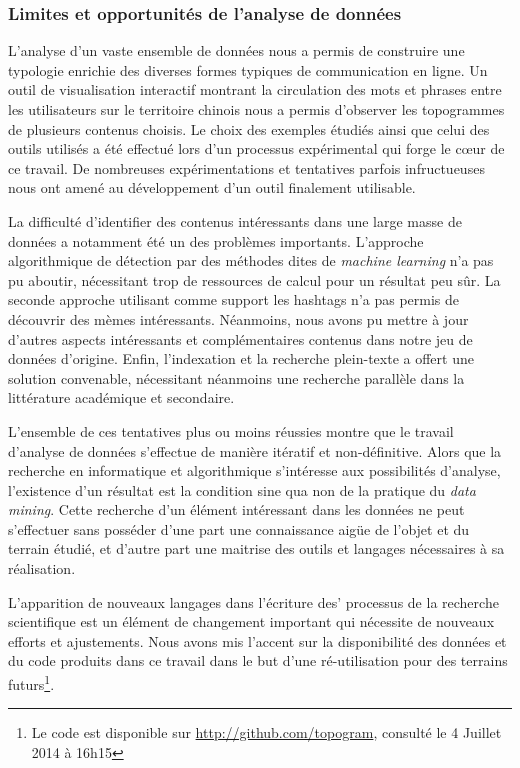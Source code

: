\subsubsection{Limites et opportunités de l'analyse de données}

L'analyse d'un vaste ensemble de données nous a permis de construire une typologie enrichie des diverses formes typiques de communication en ligne. Un outil de visualisation interactif montrant la circulation des mots et phrases entre les utilisateurs sur le territoire chinois nous a permis d'observer les topogrammes de plusieurs contenus choisis. Le choix des exemples étudiés ainsi que celui des outils utilisés a été effectué lors d'un processus expérimental qui forge le cœur de ce travail. De nombreuses expérimentations et tentatives parfois infructueuses nous ont amené au développement d'un outil finalement utilisable.

La difficulté d'identifier des contenus intéressants dans une large masse de données a notamment été un des problèmes importants. L'approche algorithmique de détection par des méthodes dites de \textit{machine learning} n'a pas pu aboutir, nécessitant trop de ressources de calcul pour un résultat peu sûr. La seconde approche utilisant comme support les hashtags n'a pas permis de découvrir des mèmes intéressants. Néanmoins, nous avons pu mettre à jour d'autres aspects intéressants et complémentaires contenus dans notre jeu de données d'origine. Enfin, l'indexation et la recherche plein-texte a offert une solution convenable, nécessitant néanmoins une recherche parallèle dans la littérature académique et secondaire.

L'ensemble de ces tentatives plus ou moins réussies montre que le travail d'analyse de données s'effectue de manière itératif et non-définitive. Alors que la recherche en informatique et algorithmique s'intéresse aux possibilités d'analyse,  l'existence d'un résultat est la condition sine qua non de la pratique du \textit{data mining}. Cette recherche d'un élément intéressant dans les données ne peut s'effectuer sans posséder d'une part une connaissance aigüe de l'objet et du terrain étudié, et d'autre part une maitrise des outils et langages nécessaires à sa réalisation. 

L'apparition de nouveaux langages dans l'écriture des' processus de la recherche scientifique est un élément de changement important qui nécessite de nouveaux efforts et ajustements. Nous avons mis l'accent sur la disponibilité des données et du code produits dans ce travail dans le but d'une ré-utilisation pour des terrains futurs\footnote{Le code est disponible sur \url{http://github.com/topogram}, consulté le 4 Juillet 2014 à 16h15}. 

